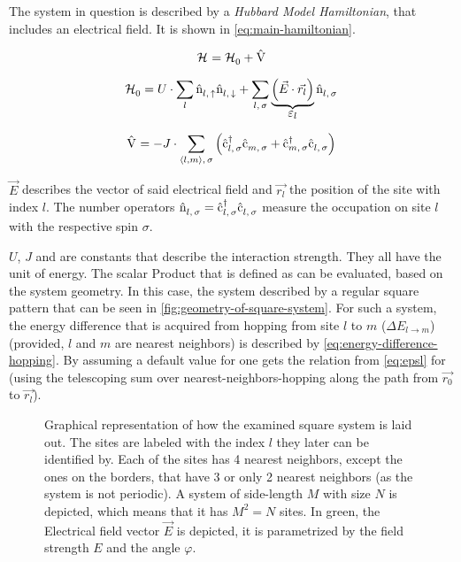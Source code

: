 The system in question is described by a \emph{Hubbard Model Hamiltonian}, that includes an electrical field. It is shown in \autoref{eq:main-hamiltonian}.


\begin{equation}
    \label{eq:main-hamiltonian}
    \pictureHamiltonian = \HzeroHamiltonian + \Vhamiltonian
\end{equation}

\begin{equation}
    \label{eq:main-hamiltonian-h0}
    \HzeroHamiltonian = U \cdot \lsum \nop{l}{\up}\nop{l}{\down} + \lsum[l,\,\sigma] \underbrace{\left(\vec{E} \cdot \vec{r_l}\right)}_{\text{\normalsize \epsl}} \nop{l}{\sigma}
\end{equation}

\begin{equation}
    \label{eq:main-hamiltonian-perturbation}
    \Vhamiltonian =  - J \cdot \neighborsumWSpin{l}{m}{\sigma} \left(\withspinop{l}{\sigma}{\dagger} \withspinop{m}{\sigma}{} + \withspinop{m}{\sigma}{\dagger} \withspinop{l}{\sigma}{} \right)
\end{equation}

$\vec{E}$ describes the vector of said electrical field and $\vec{r_l}$ the position of the site with index $l$.
The number operators $\hat{\text{n}}^{ }_{l,\,\sigma} = \hat{\text{c}}^{\dagger }_{l,\,\sigma}\hat{\text{c}}^{ }_{l,\,\sigma}$ measure the occupation on site $l$ with the respective spin $\sigma$. 

$U$, $J$ and \epsl[] are constants that describe the interaction strength. 
They all have the unit of energy. 
The scalar Product that is defined as \epsl[] can be evaluated, based on the system geometry. 
In this case, the system described by a regular square pattern that can be seen in \autoref{fig:geometry-of-square-system}. 
For such a system, the energy difference that is acquired from hopping from site $l$ to $m$ ($\Delta E_{l \rightarrow m}$) (provided, $l$ and $m$ are nearest neighbors) is described by \autoref{eq:energy-difference-hopping}. By assuming a default value for \epsl[0] one gets the relation from \autoref{eq:epsl} for \epsl{} (using the telescoping sum over nearest-neighbors-hopping along the path from $\vec{r_0}$ to $\vec{r_l}$). 

\begin{figure}[htbp]
    \centering
            
    \vspace{0.8cm}
    \caption{Graphical representation of how the examined square system is laid out. The sites are labeled with the index $l$ they later can be identified by. Each of the sites has 4 nearest neighbors, except the ones on the borders, that have 3 or only 2 nearest neighbors (as the system is not periodic). A system of side-length $M$ with size $N$ is depicted, which means that it has $M^2 = N$ sites.
    In green, the Electrical field vector $\vec{E}$ is depicted, it is parametrized by the field strength $E$ and the angle $\varphi$.}
    \label{fig:geometry-of-square-system}
\end{figure}

